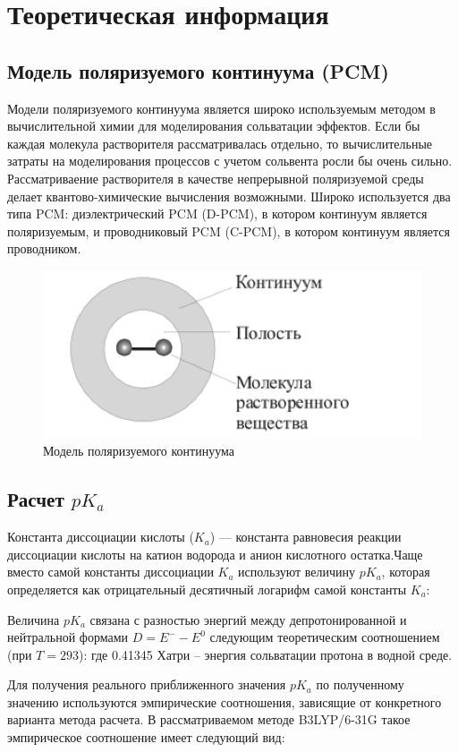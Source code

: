 \section{Теоретическая информация}
\subsection{Модель поляризуемого континуума (PCM)}
Модели поляризуемого континуума является широко используемым методом в вычислительной химии для моделирования сольватации эффектов. Если бы каждая молекула растворителя рассматривалась отдельно, то вычислительные затраты на моделирования процессов с учетом сольвента росли бы очень сильно. Рассматриваение растворителя в качестве непрерывной поляризуемой среды делает квантово-химические вычисления возможными. Широко используется два типа PCM: диэлектрический PCM (D-PCM), в котором континуум является поляризуемым, и проводниковый PCM (C-PCM), в котором континуум является проводником. 

\begin{figure}[H]
\centering
\captionsetup{justification=centering}
\includegraphics[scale=1.0]{fig/1.jpg}
\caption{Модель поляризуемого континуума}
\end{figure}


\subsection{Расчет $pK_a$}
Константа диссоциации кислоты ($K_a$) — константа равновесия реакции диссоциации кислоты на катион водорода и анион кислотного остатка.Чаще вместо самой константы диссоциации $K_a$ используют величину $pK_a$, которая определяется как отрицательный десятичный логарифм самой константы $K_a$:

Величина $pK_a$ связана с разностью энергий между депротонированной и нейтральной формами $D = E^{-} - E^{0}$ следующим теоретическим соотношением (при $T = 293$):
где 0.41345 Хатри – энергия сольватации протона в водной среде. 

Для получения реального приближенного значения $pK_a$ по полученному значению   используются эмпирические соотношения, зависящие от конкретного варианта метода расчета. В рассматриваемом методе B3LYP/6-31G такое эмпирическое соотношение имеет следующий вид:
 	
